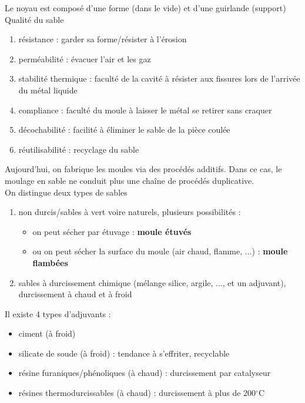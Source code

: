 \documentclass[../main.tex]{subfiles}
\begin{document}
Le noyau est composé d'une forme (dans le vide) et d'une guirlande (support)\\

Qualité du sable \begin{enumerate}
    \item résistance : garder sa forme/résister à l'érosion\\
    \item perméabilité : évacuer l'air et les gaz\\
    \item stabilité thermique : faculté de la cavité à résister aux fissures lors de l'arrivée du métal liquide\\
    \item compliance : faculté du moule à laisser le métal se retirer sans craquer\\
    \item décochabilité : facilité à éliminer le sable de la pièce coulée\\
    \item réutilisabilité : recyclage du sable\\
\end{enumerate}

Aujourd'hui, on fabrique les moules via des procédés additifs. Dans ce cas, le moulage en sable ne conduit plus une chaîne de procédés duplicative.\\

On distingue deux types de sables \begin{enumerate}
    \item non durcis/sables à vert voire naturels, plusieurs possibilités : \begin{itemize}
        \item on peut sécher par étuvage : \textbf{moule étuvés}\\
        \item ou on peut sécher la surface du moule (air chaud, flamme, $\dots$) : \textbf{moule flambées}\\
    \end{itemize}
    \item sables à durcissement chimique (mélange silice, argile, $\dots$, et un adjuvant), durcissement à chaud et à froid\\
\end{enumerate}
Il existe 4 types d'adjuvants :\begin{itemize}
    \item ciment (à froid)\\
    \item silicate de soude (à froid) : tendance à s'effriter, recyclable\\
    \item résine furaniques/phénoliques (à chaud) : durcissement par catalyseur\\
    \item résines thermodurcissables (à chaud) : durcissement à plus de 200$^\circ$C\\
\end{itemize}
\end{document}
